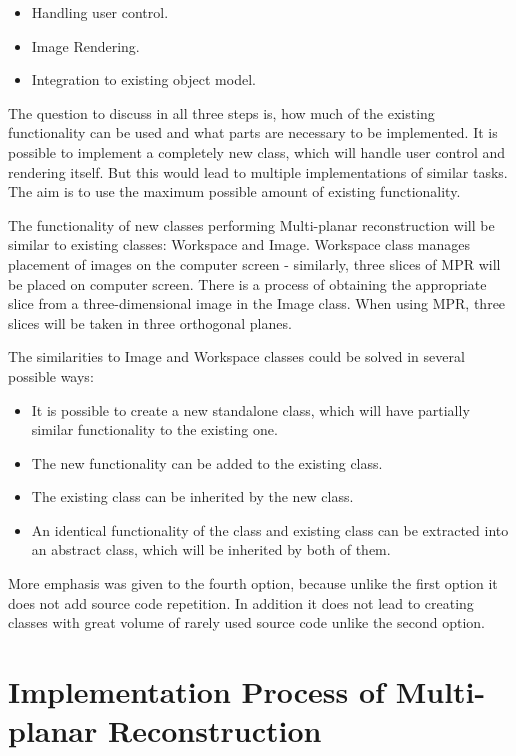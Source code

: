 \begin{itemize}
\item Handling user control.
\item Image Rendering.
\item Integration to existing object model. 
\end{itemize}

The question to discuss in all three steps is, how much of the existing functionality can be used and what parts are necessary to be implemented. It is possible to implement a completely new class, which will handle user control and rendering itself. But this would lead to multiple implementations of similar tasks. The aim is to use the maximum possible amount of existing functionality.

The functionality of new classes performing Multi-planar reconstruction will be similar to existing classes: Workspace and Image. Workspace class manages placement of images on the computer screen - similarly, three slices of MPR will be placed on computer screen. There is a process of obtaining the appropriate slice from a three-dimensional image in the Image class. When using MPR, three slices will be taken in three orthogonal planes.

The similarities to Image and Workspace classes could be solved in several possible ways:

\begin{itemize}
\item It is possible to create a new standalone class, which will have partially similar functionality to the existing one.
\item The new functionality can be added to the existing class.
\item The existing class can be inherited by the new class.
\item An identical functionality of the class and existing class can be extracted into an abstract class, which will be inherited by both of them.
\end{itemize}

More emphasis was given to the fourth option, because unlike the first option it does not add source code repetition. In addition it does not lead to creating classes with great volume of rarely used source code unlike the second option.

\section{Implementation Process of Multi-planar Reconstruction}

